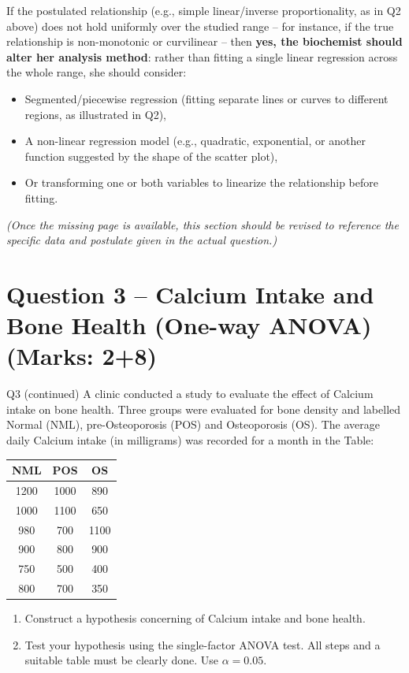 \documentclass[11pt]{article}
\begin{document}
If the postulated relationship (e.g., simple linear/inverse proportionality, as in Q2 above) does not hold uniformly over the studied range -- for instance, if the true relationship is non-monotonic or curvilinear -- then \textbf{yes, the biochemist should alter her analysis method}: rather than fitting a single linear regression across the whole range, she should consider:
\begin{itemize}
\item Segmented/piecewise regression (fitting separate lines or curves to different regions, as illustrated in Q2),
\item A non-linear regression model (e.g., quadratic, exponential, or another function suggested by the shape of the scatter plot),
\item Or transforming one or both variables to linearize the relationship before fitting.
\end{itemize}

\textit{(Once the missing page is available, this section should be revised to reference the specific data and postulate given in the actual question.)}

\section{Question 3 -- Calcium Intake and Bone Health (One-way ANOVA) (Marks: 2+8)}
\begin{question}{Q3 (continued)}
A clinic conducted a study to evaluate the effect of Calcium intake on bone health. Three groups were evaluated for bone density and labelled Normal (NML), pre-Osteoporosis (POS) and Osteoporosis (OS). The average daily Calcium intake (in milligrams) was recorded for a month in the Table:

\begin{center}
\begin{tabular}{ccc}
\toprule
NML & POS & OS \\
\midrule
1200 & 1000 & 890 \\
1000 & 1100 & 650 \\
980  & 700  & 1100 \\
900  & 800  & 900 \\
750  & 500  & 400 \\
800  & 700  & 350 \\
\bottomrule
\end{tabular}
\end{center}

\begin{enumerate}[label=(\alph*)]
\item Construct a hypothesis concerning of Calcium intake and bone health.
\item Test your hypothesis using the single-factor ANOVA test. All steps and a suitable table must be clearly done. Use $\alpha=0.05$.
\end{enumerate}
\end{question}
\end{document}
